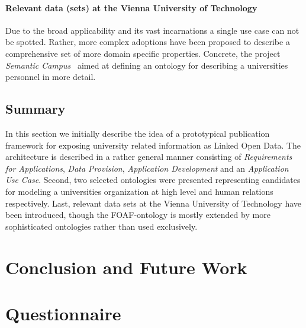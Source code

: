 \documentclass{article}
\begin{document}
\paragraph{Relevant data (sets) at the Vienna University of Technology}
Due to the broad applicability and its vast incarnations a single use case can not be spotted. Rather, more complex adoptions have been proposed to describe a comprehensive set of more domain specific properties. Concrete, the project \textit{Semantic Campus}~\cite{inproceedings:semantic-campus} aimed at defining an ontology for describing a universities personnel in more detail. 
\subsection{Summary}
In this section we initially describe the idea of a prototypical publication framework for exposing university related information as Linked Open Data. The architecture is described in a rather general manner consisting of \textit{Requirements for Applications}, \textit{Data Provision}, \textit{Application Development} and an \textit{Application Use Case}. Second, two selected ontologies were presented representing candidates for modeling a universities organization at high level and human relations respectively.
Last, relevant data sets at the Vienna University of Technology have been introduced, though the FOAF-ontology is mostly extended by more sophisticated ontologies rather than used exclusively. 
\section{Conclusion and Future Work}

\newpage
{}



\newpage
\appendix

\section{Questionnaire}

\end{document}
